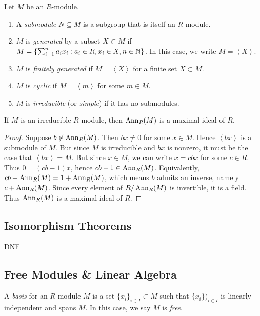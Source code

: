 \begin{definition}
	Let $M$ be an $R$-module.
	\mbox{}
	\begin{enumerate}[label = (\arabic*),itemsep=1pt,topsep=3pt]
		\item A \emph{submodule} $N \subseteq M$ is a subgroup that is itself an $R$-module.
		\item $M$ is \emph{generated} by a subset $X \subset M$ if $M = \{\sum_{i=1}^{n} a_i x_i : a_i \in R, x_i \in X, n \in \mathbb{N}\}$. In this case, we write $M = \left<X \right>$.
		\item $M$ is \emph{finitely generated} if $M = \left<X \right>$ for a finite set $X \subset M$.
		\item $M$ is \emph{cyclic} if $M = \left<m \right>$ for some $m \in M$.
		\item $M$ is \emph{irreducible} (or \emph{simple}) if it has no submodules.
	\end{enumerate}
\end{definition}

\begin{proposition}
	If $M$ is an irreducible $R$-module, then $\operatorname{Ann}_R(M)$ is a maximal ideal of $R$.
\end{proposition}
	\begin{proof}
		Suppose $b \not\in \operatorname{Ann}_R(M)$. Then $bx \neq 0$ for some $x \in M$. Hence $\left<bx \right>$ is a submodule of $M$. But since $M$ is irreducible and $bx$ is nonzero, it must be the case that $\left<bx \right> = M$. But since $x \in M$, we can write $x = cbx$ for some $c \in R$. Thus $0 = (cb-1)x$, hence $cb - 1 \in \operatorname{Ann}_R(M)$. Equivalently, $cb + \operatorname{Ann}_R(M) = 1 + \operatorname{Ann}_R(M)$, which means $b$ admits an inverse, namely $c + \operatorname{Ann}_R(M)$. Since every element of $R/\operatorname{Ann}_R(M)$ is invertible, it is a field. Thus $\operatorname{Ann}_R(M)$ is a maximal ideal of $R$. 
	\end{proof}

\subsection{Isomorphism Theorems}

{\color{red} DNF}

\subsection{Free Modules \& Linear Algebra}

\begin{definition}
	A \emph{basis} for an $R$-module $M$ is a set $\{x_i\}_{i \in I} \subset M$ such that $\{x_i\})_{i \in I}$ is linearly independent and spans $M$. In this case, we say $M$ is \emph{free}. 
\end{definition}

